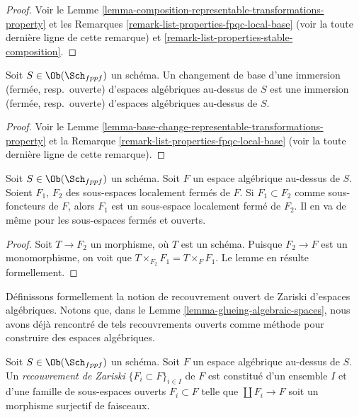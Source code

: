 \begin{proof}
Voir le Lemme \ref{lemma-composition-representable-transformations-property} et les
Remarques \ref{remark-list-properties-fpqc-local-base} (voir la toute dernière ligne de
cette remarque) et \ref{remark-list-properties-stable-composition}.
\end{proof}

\begin{lemma}
\label{lemma-base-change-immersions}
Soit $S \in \Ob(\Sch_{fppf})$ un schéma.
Un changement de base d'une immersion (fermée, resp.\ ouverte)
d'espaces algébriques au-dessus de $S$ est une immersion (fermée, resp.\ ouverte)
d'espaces algébriques au-dessus de $S$.
\end{lemma}

\begin{proof}
Voir le Lemme \ref{lemma-base-change-representable-transformations-property} et la
Remarque \ref{remark-list-properties-fpqc-local-base} (voir la toute dernière ligne de
cette remarque).
\end{proof}

\begin{lemma}
\label{lemma-sub-subspaces}
Soit $S \in \Ob(\Sch_{fppf})$ un schéma.
Soit $F$ un espace algébrique au-dessus de $S$. Soient $F_1$, $F_2$ des
sous-espaces localement fermés de $F$. Si $F_1 \subset F_2$ comme sous-foncteurs
de $F$, alors $F_1$ est un sous-espace localement fermé de $F_2$.
Il en va de même pour les sous-espaces fermés et ouverts.
\end{lemma}

\begin{proof}
Soit $T \to F_2$ un morphisme, où $T$ est un schéma.
Puisque $F_2 \to F$ est un monomorphisme, on voit que
$T \times_{F_2} F_1 = T \times_F F_1$. Le lemme en résulte
formellement.
\end{proof}

\noindent
Définissons formellement la notion de recouvrement ouvert de Zariski
d'espaces algébriques. Notons que, dans le Lemme \ref{lemma-glueing-algebraic-spaces},
nous avons déjà rencontré de tels recouvrements ouverts comme méthode pour
construire des espaces algébriques.

\begin{definition}
\label{definition-Zariski-open-covering}
Soit $S \in \Ob(\Sch_{fppf})$ un schéma.
Soit $F$ un espace algébrique au-dessus de $S$.
Un {\it recouvrement de Zariski} $\{F_i \subset F\}_{i \in I}$ de $F$
est constitué d'un ensemble $I$ et d'une famille de sous-espaces ouverts
$F_i \subset F$ telle que $\coprod F_i \to F$ soit un morphisme surjectif
de faisceaux.
\end{definition}

